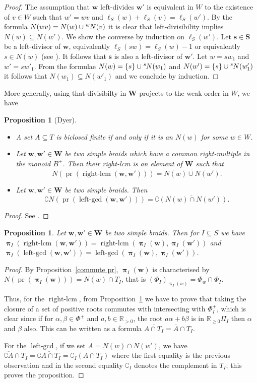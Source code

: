 \documentclass{amsart}
\numberwithin{equation}{section}
\newtheorem{proposition}[equation]{Proposition}
\newcommand\lexp[2]{\kern\scriptspace\vphantom{#2}^{#1}\kern-\scriptspace#2}
\newcommand\bs{{\mathbf s}}
\newcommand\bw{{\mathbf w}}
\newcommand\bS{{\mathbf S}}
\newcommand\bW{{\mathbf W}}
\newcommand\BR{{\mathbb R}}
\DeclareMathOperator\rightlcm{right-lcm}
\DeclareMathOperator\leftgcd{left-gcd}
\DeclareMathOperator\pr{pr}
\DeclareMathOperator\bpi{\boldsymbol\pi}
\begin{document}
\begin{proof}
The assumption that $\bw$ left-divides $\bw'$ is equivalent in $W$ 
to the existence of $v\in W$ such that $w'=wv$ and
$\ell_S(w)+\ell_S(v)=\ell_S(w')$. By the formula $N(wv)=N(w)\cup \lexp wN(v)$ it is clear
that left-divisibility implies $N(w)\subseteq N(w')$. We show the converse
by induction on $\ell_S(w')$. Let $\bs\in \bS$ be a left-divisor of $\bw$, equivalently
$\ell_S(sw)=\ell_S(w)-1$ or equivalently $s\in N(w)$ 
(see \cite[Lemma 2.1.6(ii)]{digne-michel}). It follows that
$\bs$ is also a left-divisor of $\bw'$. Let $w=sw_1$ and $w'=sw'_1$.
 From the formulae $N(w)=\{s\}\cup\lexp sN(w_1)$ and 
$N(w')=\{s\}\cup\lexp sN(w'_1)$ it follows that $N(w_1)\subseteq N(w'_1)$
and we conclude by induction.
\end{proof}
More generally, using that divisibilty in $\bW$ projects to the
weak order in $W$, we have
\begin{proposition}[Dyer]\label{Dyer}\phantom{}
\begin{itemize}
\item A set $A\subseteq T$ is biclosed finite if and only if it is an $N(w)$ for
some $w\in W$.
\item Let $\bw,\bw'\in\bW$ be two simple braids which have a common right-multiple
in the monoid $B^+$. 
Then their right-lcm is an element of $\bW$ such that 
$$N(\pr(\rightlcm(\bw,\bw')))= \overline{N(w)\cup N(w')}.$$
\item Let $\bw,\bw'\in\bW$ be two simple braids. Then 
$$\complement N(\pr(\leftgcd(\bw,\bw')))=\overline{\complement(N(w)\cap N(w'))}.$$
\end{itemize}
\end{proposition}
\begin{proof}
See \cite[4.1, 1.5]{dyer}.
\end{proof}
\begin{proposition} Let $\bw,\bw'\in\bW$ be two simple braids. 
Then for $I\subseteq S$ we have
$\bpi_I(\rightlcm(\bw,\bw'))=\rightlcm(\bpi_I(\bw),\bpi_I(\bw'))$ and
$\bpi_I(\leftgcd(\bw,\bw'))=\leftgcd(\bpi_I(\bw),\bpi_I(\bw'))$.
\end{proposition}
\begin{proof}
By   Proposition~\ref{commute   pr},  $\bpi_I(\bw)$   is  characterised  by
 $N(\pr(\bpi_I(\bw)))=N(w)\cap T_I$,  that    is    $(\Phi_I)_{\bpi_I(w)}=
\Phi_w\cap\Phi_I$. 

Thus, for the $\rightlcm$, from Proposition~\ref{Dyer} we have to prove that
taking the closure  of a  set of  positive roots  commutes with  intersecting with
$\Phi_I^+$,  which  is  clear  since  if  for  $\alpha,\beta\in\Phi^+$  and
$a,b\in\BR_{>0}$,  the  root  $a\alpha+b\beta$  is  in  $\BR_{\ge 0}\Pi_I$ then
$\alpha$ and $\beta$ also. This can be written as a formula
$\overline{A\cap T_I}=\overline A\cap T_I$.

For the $\leftgcd$, if we set $A=N(w)\cap N(w')$, we have
$\overline{\complement A}\cap T_I=\overline{\complement A\cap T_I}=
\overline{\complement_I(A\cap T_I)}$ where the first equality is the previous
observation and in the second equality $\complement_I$ denotes the complement in $ T_I$;
this proves the proposition.
\end{proof}
\end{document}
